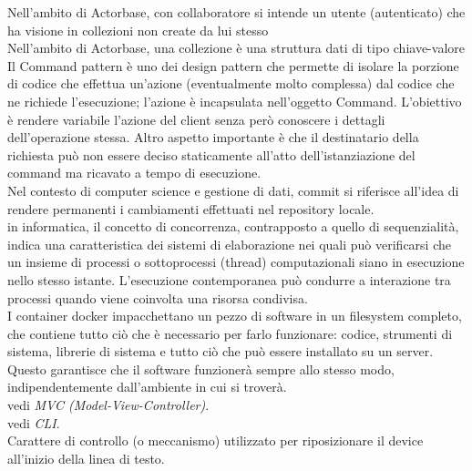 \documentclass{scalatekids-article}
\begin{document}
 Nell'ambito di Actorbase, con collaboratore si intende un utente (autenticato) che ha visione in collezioni non create da lui stesso
\\

 Nell'ambito di Actorbase, una collezione è una struttura dati di tipo chiave-valore
\\

 Il Command pattern è uno dei design pattern che permette di isolare la porzione di codice che effettua un'azione (eventualmente molto complessa) dal codice che ne richiede l'esecuzione; l'azione è incapsulata nell'oggetto Command.
L'obiettivo è rendere variabile l'azione del client senza però conoscere i dettagli dell'operazione stessa. Altro aspetto importante è che il destinatario della richiesta può non essere deciso staticamente all'atto dell'istanziazione del command ma ricavato a tempo di esecuzione.
\\

 Nel contesto di computer science e gestione di dati, commit si riferisce all'idea di rendere permanenti i cambiamenti effettuati nel repository locale.
\\

 in informatica, il concetto di concorrenza, contrapposto a quello di sequenzialità, indica una caratteristica dei sistemi di elaborazione nei quali può verificarsi che un insieme di processi o sottoprocessi (thread) computazionali siano in esecuzione nello stesso istante.
L'esecuzione contemporanea può condurre a interazione tra processi quando viene coinvolta una risorsa condivisa.
\\

 I container docker impacchettano un pezzo di software in un filesystem completo, che contiene tutto ciò che è necessario per farlo funzionare: codice, strumenti di sistema, librerie di sistema e tutto ciò che può essere installato su un server.
Questo garantisce che il software funzionerà sempre allo stesso modo, indipendentemente dall'ambiente in cui si troverà.
\\

 vedi \textit{MVC (Model-View-Controller)}.
\\

 vedi \textit{CLI}.
\\

 Carattere di controllo (o meccanismo) utilizzato per riposizionare il device all'inizio della linea di testo.
\\
\end{document}

